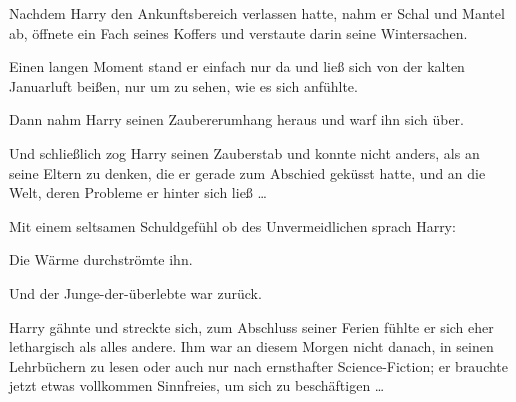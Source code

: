 
Nachdem Harry den Ankunftsbereich verlassen hatte, nahm er Schal und Mantel ab, öffnete ein Fach seines Koffers und verstaute darin seine Wintersachen.

Einen langen Moment stand er einfach nur da und ließ sich von der kalten Januarluft beißen, nur um zu sehen, wie es sich anfühlte.

Dann nahm Harry seinen Zaubererumhang heraus und warf ihn sich über.

Und schließlich zog Harry seinen Zauberstab und konnte nicht anders, als an seine Eltern zu denken, die er gerade zum Abschied geküsst hatte, und an die Welt, deren Probleme er hinter sich ließ …

Mit einem seltsamen Schuldgefühl ob des Unvermeidlichen sprach Harry: 

Die Wärme durchströmte ihn.

Und der Junge-der-überlebte war zurück.

Harry gähnte und streckte sich, zum Abschluss seiner Ferien fühlte er sich eher lethargisch als alles andere. Ihm war an diesem Morgen nicht danach, in seinen Lehrbüchern zu lesen oder auch nur nach ernsthafter Science-Fiction; er brauchte jetzt etwas vollkommen Sinnfreies, um sich zu beschäftigen …


